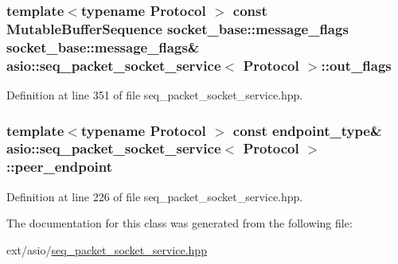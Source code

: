 \hypertarget{classasio_1_1seq__packet__socket__service_a5e754db990933b1a14ec37587e80d825}{}
\subsubsection[{out\+\_\+flags}]{\setlength{\rightskip}{0pt plus 5cm}template$<$typename Protocol $>$ const Mutable\+Buffer\+Sequence {\bf socket\+\_\+base\+::message\+\_\+flags} {\bf socket\+\_\+base\+::message\+\_\+flags}\& {\bf asio\+::seq\+\_\+packet\+\_\+socket\+\_\+service}$<$ Protocol $>$\+::out\+\_\+flags}\label{classasio_1_1seq__packet__socket__service_a5e754db990933b1a14ec37587e80d825}


Definition at line 351 of file seq\+\_\+packet\+\_\+socket\+\_\+service.\+hpp.

\hypertarget{classasio_1_1seq__packet__socket__service_a4423f9f6b399d358e6ff2856662765c1}{}
\subsubsection[{peer\+\_\+endpoint}]{\setlength{\rightskip}{0pt plus 5cm}template$<$typename Protocol $>$ const {\bf endpoint\+\_\+type}\& {\bf asio\+::seq\+\_\+packet\+\_\+socket\+\_\+service}$<$ Protocol $>$\+::peer\+\_\+endpoint}\label{classasio_1_1seq__packet__socket__service_a4423f9f6b399d358e6ff2856662765c1}


Definition at line 226 of file seq\+\_\+packet\+\_\+socket\+\_\+service.\+hpp.



The documentation for this class was generated from the following file\+:\begin{DoxyCompactItemize}
\item 
ext/asio/\hyperlink{seq__packet__socket__service_8hpp}{seq\+\_\+packet\+\_\+socket\+\_\+service.\+hpp}\end{DoxyCompactItemize}
